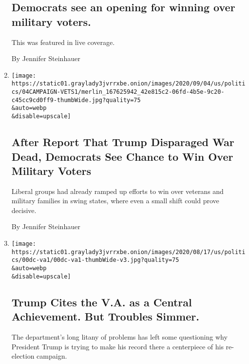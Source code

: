 \begin{enumerate}
{  \subsection{Democrats see an opening for winning over military
  voters.}\label{democrats-see-an-opening-for-winning-over-military-voters}}

  This was featured in live coverage.

  By Jennifer Steinhauer
\item
  \href{/2020/09/04/us/politics/trump-military-vote-democrats.html}{}

  \texttt{[image: https://static01.graylady3jvrrxbe.onion/images/2020/09/04/us/politics/04CAMPAIGN-VETS1/merlin\_167625942\_42e815c2-06fd-4b5e-9c20-c45cc9cd0ff9-thumbWide.jpg?quality=75\\\&auto=webp\\\&disable=upscale]}

  \hypertarget{after-report-that-trump-disparaged-war-dead-democrats-see-chance-to-win-over-military-voters}{%
  \subsection{After Report That Trump Disparaged War Dead, Democrats See
  Chance to Win Over Military
  Voters}\label{after-report-that-trump-disparaged-war-dead-democrats-see-chance-to-win-over-military-voters}}

  Liberal groups had already ramped up efforts to win over veterans and
  military families in swing states, where even a small shift could
  prove decisive.

  By Jennifer Steinhauer
\item
  \href{/2020/08/19/us/politics/trump-veterans.html}{}

  \texttt{[image: https://static01.graylady3jvrrxbe.onion/images/2020/08/17/us/politics/00dc-va1/00dc-va1-thumbWide-v3.jpg?quality=75\\\&auto=webp\\\&disable=upscale]}

  \hypertarget{trump-cites-the-va-as-a-central-achievement-but-troubles-simmer}{%
  \subsection{Trump Cites the V.A. as a Central Achievement. But
  Troubles
  Simmer.}\label{trump-cites-the-va-as-a-central-achievement-but-troubles-simmer}}

  The department's long litany of problems has left some questioning why
  President Trump is trying to make his record there a centerpiece of
  his re-election campaign.


\end{enumerate}
